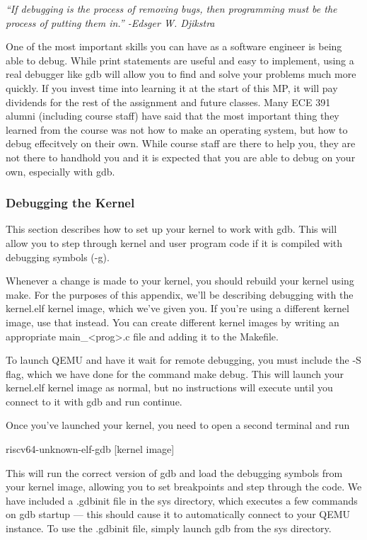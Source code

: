 \documentclass{article}
\begin{document}

	\emph{``If debugging is the process of removing bugs, then programming must be the process of putting them in.'' -Edsger W. Djikstra}

	One of the most important skills you can have as a software engineer is being able to debug.
	While print statements are useful and easy to implement, using a real debugger like gdb will
	allow you to find and solve your problems much more quickly. If you invest time into learning
	it at the start of this MP, it will pay dividends for the rest of the assignment and future classes.
	Many ECE 391 alumni (including course staff) have said that the most important thing they learned from the course
	was not how to make an operating system, but how to debug effecitvely on their own. While course
	staff are there to help you, they are not there to handhold you and it is expected that you are able
	to debug on your own, especially with gdb.

	\subsubsection{Debugging the Kernel}

	This section describes how to set up your kernel to work with gdb. This will 
	allow you to step through kernel and user program code if it is compiled 
	with debugging symbols ({\fix -g}).

	Whenever a change is made to your kernel, you should rebuild your kernel
	using {\fix make}. For the purposes of this appendix, we'll be describing debugging with
	the {\fix kernel.elf} kernel image, which we've given you. If you're using a different
	kernel image, use that instead. You can create 
	different kernel images by writing an appropriate {\fix main\_<prog>.c} file
	and adding it to the {\fix Makefile}.

	To launch QEMU and have it wait for remote debugging, you must include the
	{\fix -S} flag, which we have done for the command {\fix make debug}. This
	will launch your {\fix kernel.elf} kernel image as normal, but no instructions
	will execute until you connect to it with gdb and run {\fix continue}.

	Once you've launched your kernel, you need to open a second terminal and run
	
	{\fix riscv64-unknown-elf-gdb [kernel image]}

	This will run the correct version of gdb and load the debugging symbols from
	your kernel image, allowing you to set breakpoints and step through the code.
	We have included a {\fix .gdbinit} file in the {\fix sys} directory, which
	executes a few commands on gdb startup --- this should cause it to automatically 
	connect to your QEMU instance. To use the {\fix .gdbinit} file, simply launch
	gdb from the {\fix sys} directory.\\
\end{document}
